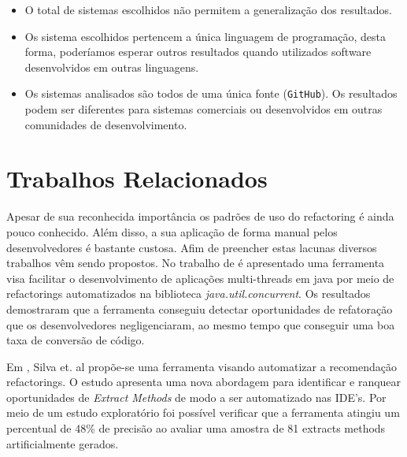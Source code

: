 \documentclass[12pt]{article}
\begin{document}
 \begin{itemize}
 	
  \item O total de sistemas escolhidos não permitem a generalização dos resultados.
  
  \item  Os sistema escolhidos pertencem a única linguagem de programação, desta forma, poderíamos esperar outros resultados quando utilizados software desenvolvidos em outras linguagens.
  
  \item Os sistemas analisados são todos de uma  única fonte (\texttt{GitHub}). Os resultados podem ser diferentes para sistemas comerciais ou desenvolvidos em outras comunidades de desenvolvimento.
  
 \end{itemize}

\section{Trabalhos Relacionados}
\label{sec:trabalhos-relacionados}

Apesar de sua reconhecida importância os padrões de uso do refactoring é ainda pouco conhecido. Além disso, a sua aplicação de forma manual pelos desenvolvedores é bastante custosa. Afim de preencher estas lacunas diversos trabalhos vêm sendo propostos.  No trabalho de \cite{Dig:2009:RSJ:1555001.1555054}{} é apresentado uma ferramenta visa facilitar o desenvolvimento de aplicações multi-threads em java por meio de refactorings automatizados na biblioteca \textit{java.util.concurrent}{}. Os resultados demostraram que a ferramenta conseguiu detectar oportunidades de refatoração que os desenvolvedores negligenciaram, ao mesmo tempo que conseguir uma boa taxa de conversão de código. 

Em \cite{icpc2014}, Silva et. al propõe-se uma ferramenta visando automatizar a recomendação  refactorings. O estudo apresenta uma nova abordagem para identificar e ranquear oportunidades de \textit{Extract Methods} de modo a ser automatizado nas IDE's. Por meio de um estudo exploratório foi possível verificar que a ferramenta atingiu um percentual de 48\% de precisão ao avaliar uma amostra de 81 extracts methods artificialmente gerados. 
\end{document}

